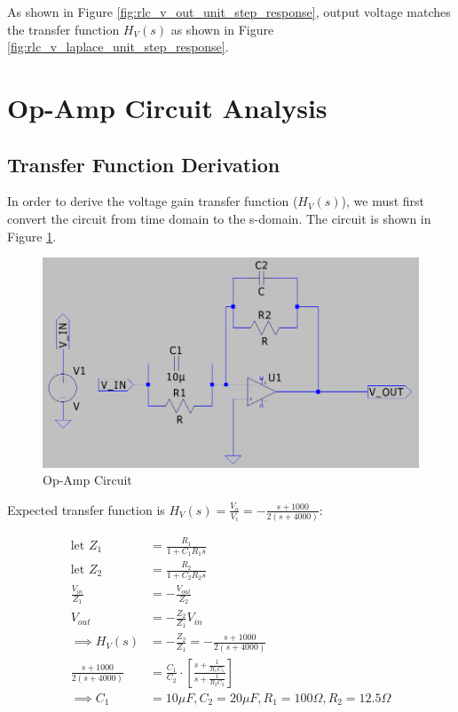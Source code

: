 As shown in Figure \ref{fig:rlc_v_out_unit_step_response}, output voltage matches the transfer function $H_{V}(s)$ as shown in Figure \ref{fig:rlc_v_laplace_unit_step_response}.

\newpage
\thispagestyle{plain}

\section{Op-Amp Circuit Analysis}

\subsection{Transfer Function Derivation}
In order to derive the voltage gain transfer function ($H_{V}(s)$), we must first convert the circuit from time domain to the s-domain. The circuit is shown in Figure \ref{fig:op_amp_circuit}.

\begin{figure}[h]
    \centering
    \includegraphics[width=1\textwidth]{assets/opamp-circ.png}
    \caption{Op-Amp Circuit}
    \label{fig:op_amp_circuit}
\end{figure}

\noindent Expected transfer function is $H_{V}(s) = \frac{V_{o}}{V_{i}} = -\frac{s+1000}{2(s+4000)}$:


\begin{align*}
    \text{let } Z_1 &= \frac{R_1}{1 + C_1 R_1 s} \\
    \text{let } Z_2 &= \frac{R_2}{1 + C_2 R_2 s} \\
    \frac{V_{in}}{Z_1} &= -\frac{V_{out}}{Z_2}\\
    V_{out} &= -\frac{Z_2}{Z_1} V_{in} \\
    \implies H_{V}(s) &= -\frac{Z_2}{Z_1} = -\frac{s+1000}{2(s+4000)} \\
    \frac{s+1000}{2(s+4000)} &= \frac{C_1}{C_2}\cdot \left[ \frac{s + \frac{1}{R_1 C_1}}{s + \frac{1}{R_2 C_2}} \right] \\
    \implies C_1 &= 10\mu F, C_2 = 20\mu F, R_1 = 100\Omega, R_2 = 12.5\Omega
\end{align*}

